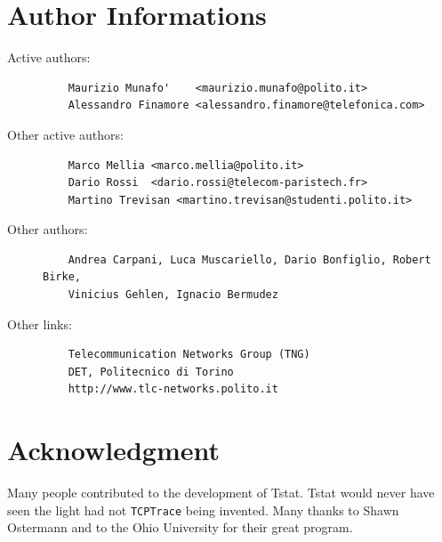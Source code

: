 \documentclass[11pt]{article}
\begin{document}
\section{Author Informations\label{Author_Informations}}
\begin{description}

\item[{Active authors:}] \mbox{}\begin{small}\begin{verbatim}
    Maurizio Munafo'    <maurizio.munafo@polito.it>
    Alessandro Finamore <alessandro.finamore@telefonica.com>
\end{verbatim}\end{small} \noindent
\item[{Other active authors:}] \mbox{}\begin{small}\begin{verbatim}
    Marco Mellia <marco.mellia@polito.it>
    Dario Rossi  <dario.rossi@telecom-paristech.fr> 
    Martino Trevisan <martino.trevisan@studenti.polito.it>
\end{verbatim}\end{small} \noindent
\item[{Other authors:}] \mbox{}\begin{small}\begin{verbatim}
    Andrea Carpani, Luca Muscariello, Dario Bonfiglio, Robert Birke, 
    Vinicius Gehlen, Ignacio Bermudez
\end{verbatim}\end{small} \noindent
\item[{Other links:}] \mbox{}\begin{small}\begin{verbatim}
    Telecommunication Networks Group (TNG)
    DET, Politecnico di Torino
    http://www.tlc-networks.polito.it
\end{verbatim}\end{small} \noindent
\end{description}
\section{Acknowledgment\label{Acknowledgment}}


Many people contributed to the development of Tstat. Tstat would never have seen
the light had not \texttt{TCPTrace} being invented.
Many thanks to Shawn Ostermann and to the  Ohio
University for their great program.
\end{document}
